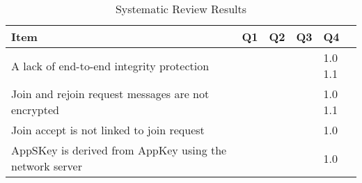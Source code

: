 \documentclass[manuscript,screen,review=false]{acmart}
\begin{document}
\begin{table}[!ht]
\centering
\caption{Systematic Review Results}
\label{systematic_review_results}
    \begin{tabular}{p{}|p{}|p{}|p{}|p{}}
    \hline
    \textbf{Item}  & \textbf{Q1} & \textbf{Q2}  & \textbf{Q3} & \textbf{Q4} \\ \hline 
    
     A lack of end-to-end integrity protection 
     & \cite{01_formal_security_analysis_LoRaWAN} 
     \cite{03_security_LoRaWANv1.1_scenarios}
     \cite{24_securely_IoT_lorawan} \cite{37_security_vulnerabilities_lorawan}
     \cite{59_IoT_security_overview_practical_demonstration} \cite{98_lorawan_framework_smarthome}
     & \cite{24_securely_IoT_lorawan} \cite{37_security_vulnerabilities_lorawan}
     \cite{98_lorawan_framework_smarthome}
     & \cite{37_security_vulnerabilities_lorawan}
     & 1.0 1.1 \\ \hline
     
    Join and rejoin request messages are not encrypted 
    & \cite{01_formal_security_analysis_LoRaWAN}   \cite{35_third_party_key_management} \cite{44_countermeasure_replay_attack}    \cite{49_analysis_lorawan_duty_cycle} \cite{70_low_throughput_networks_IoT} \cite{107_blockchain_authentication} 
    & \cite{44_countermeasure_replay_attack} \cite{49_analysis_lorawan_duty_cycle} \cite{107_blockchain_authentication} 
    &  \cite{01_formal_security_analysis_LoRaWAN} \cite{44_countermeasure_replay_attack} \cite{107_blockchain_authentication} 
    & 1.0 1.1 \\ \hline

    Join accept is not linked to join request 
    &  \cite{01_formal_security_analysis_LoRaWAN} \cite{03_security_LoRaWANv1.1_scenarios}    \cite{92_DoS_lorawan} 
    & \cite{92_DoS_lorawan} 
    &  \cite{01_formal_security_analysis_LoRaWAN}    \cite{92_DoS_lorawan} 
    & 1.0 \\ \hline 

    AppSKey is derived from AppKey using the network server
    &  \cite{02_security_procedure_LoRaWANv1.1} \cite{35_third_party_key_management} 
    \cite{56_session_key_management} \cite{90_separate_session_key_generation} \cite{98_lorawan_framework_smarthome} 
    & \cite{02_security_procedure_LoRaWANv1.1}  \cite{35_third_party_key_management}  \cite{56_session_key_management} \cite{90_separate_session_key_generation}  \cite{98_lorawan_framework_smarthome}  
    & \cite{35_third_party_key_management}   \cite{90_separate_session_key_generation}  
    & 1.0 \\ \hline 
   

\end{tabular}
\end{table}
\end{document}
